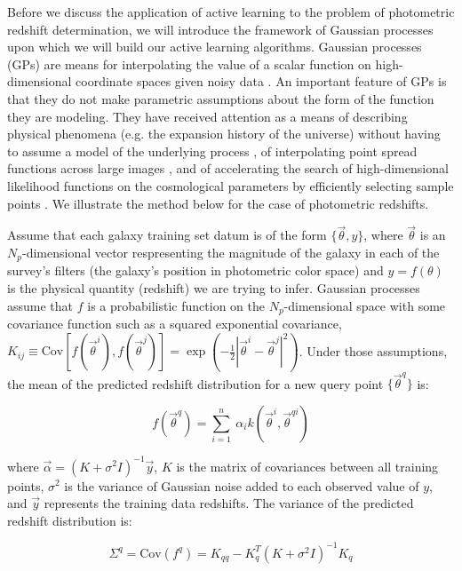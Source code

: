\documentclass[prd, nofootinbib, floatfix, 12pt,tightenlines]{revtex4}
\begin{document}
Before we discuss the application of active learning to the problem of
photometric redshift determination, we will introduce the framework of Gaussian
processes upon which we will build our active learning algorithms.
Gaussian processes (GPs) are means for interpolating the value of a scalar
function on high-dimensional coordinate spaces given noisy data \cite{gp}.
An important feature of GPs is that they do not make parametric assumptions
about the form of the function they are modeling.  They have received
attention as a means of describing physical phenomena (e.g. the expansion
history of the universe) without having to assume a model of the underlying
process \cite{ericgp}, of interpolating point spread functions across large
images \cite{psf}, and of accelerating the search of high-dimensional
likelihood functions on the cosmological parameters by efficiently
selecting sample points \cite{daniel2012}.  We illustrate the method below for the
case of photometric redshifts.

Assume that each galaxy training set datum is of the form
$\{\vec{\theta},y\}$, where $\vec{\theta}$ is an $N_p$-dimensional vector
respresenting the magnitude of the galaxy in each of the survey's filters
(the galaxy's position in photometric color space) and $y = f(\theta)$ is
the physical quantity (redshift) we are trying to infer.  Gaussian
processes assume that $f$ is a probabilistic function on the
$N_p$-dimensional space with some covariance function such as a squared
exponential covariance,
$K_{ij}\equiv\text{Cov}\left[f(\vec{\theta}^{i}),f(\vec{\theta}^{j})\right]
= \exp(-\frac{1}{2}|\vec{\theta}^{i} - \vec{\theta}^{j}|^2)$.
Under those assumptions, the mean of the predicted redshift distribution
for a new query point $\{\vec{\theta}^{q}\}$ is:

\begin{equation}
f(\vec{\theta}^{q}) = \sum_{i=1}^n \
\alpha_i k(\vec{\theta}^{i},\vec{\theta}^{qi})
\label{eq:mean}
\end{equation}

\noindent
where $\vec{\alpha} = (K + \sigma^2 I)^{-1}\vec{y}$, $K$ is the matrix of
covariances between all training points, $\sigma^2$ is the variance of
Gaussian noise added to each observed value of $y$, and $\vec{y}$
represents the training data redshifts.  The variance of the predicted
redshift distribution is:

\begin{equation}
\Sigma^{q} = \text{Cov}(f^{q}) = K_{qq} - K_q^T (K + \sigma^2I)^{-1} K_q
\label{eq:cov}
\end{equation}
\end{document}

